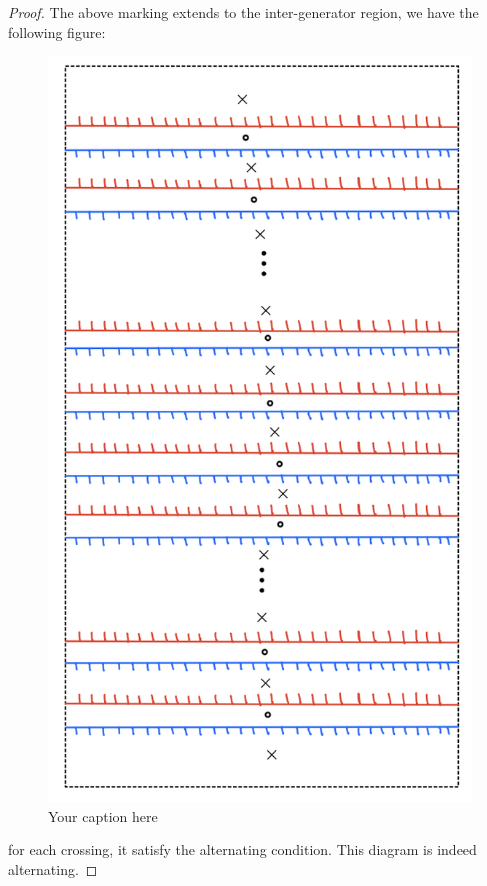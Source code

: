 \begin{proof}
The above marking extends to the inter-generator region, we have the following figure:

\begin{figure}[H] 
    \centering
    \includegraphics[scale = 0.95]{diagrams/natural_alternating_diagrams/12.png}
    \caption{Your caption here}
    \label{fig:your-label}
\end{figure}

for each crossing, it satisfy the alternating condition. This diagram is indeed alternating.
\end{proof}